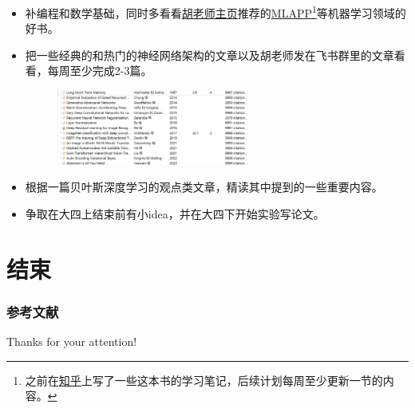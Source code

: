 \documentclass[aspectratio=169]{beamer}
\begin{document}
\begin{frame}
  \begin{itemize}
    \item 补编程和数学基础，同时多看看\href{https://wbhu.net/mlapp-reading}{胡老师主页}推荐的\href{https://probml.github.io/pml-book/}{MLAPP}\footnote<1->{之前在\href{https://zhuanlan.zhihu.com/p/699377272}{知乎}上写了一些这本书的学习笔记，后续计划每周至少更新一节的内容。}等机器学习领域的好书。\pause
    \item 把一些经典的和热门的神经网络架构的文章以及胡老师发在飞书群里的文章看看，每周至少完成2-3篇。
    \begin{figure}
      \centering
      \includegraphics[width=0.6\textwidth]{images/NN.png}
    \end{figure}
    \pause
    \item 根据一篇贝叶斯深度学习的观点类文章，精读其中提到的一些重要内容。\pause
    \item 争取在大四上结束前有小idea，并在大四下开始实验写论文。
  \end{itemize}
\end{frame}

\section{结束}
\begin{frame}[allowframebreaks]
	\frametitle{参考文献}
	{
		\tiny
		\nocite{*}
		\printbibliography[heading=none]
	}
\end{frame}

\begin{frame}
	\begin{center}
    {\Huge\calligra Thanks for your attention!}
  \end{center}
\end{frame}
\end{document}

